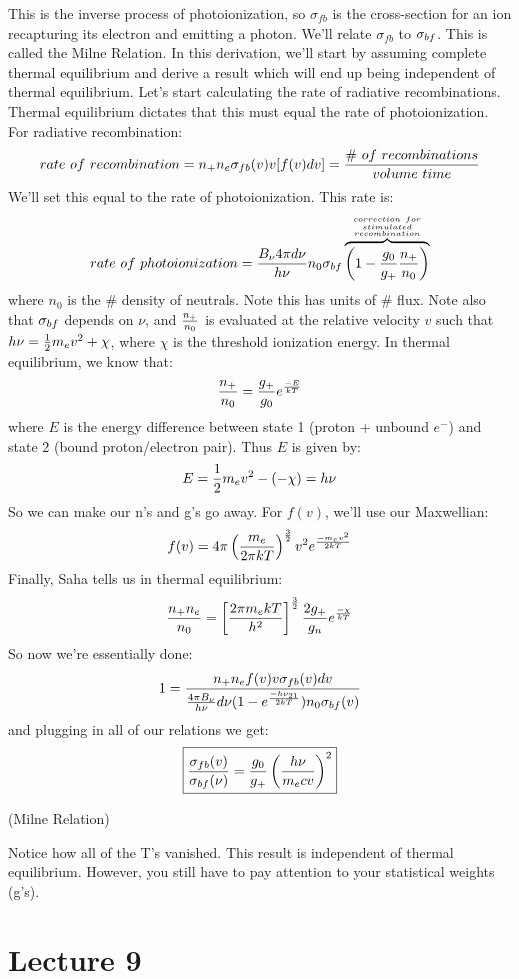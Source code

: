 \documentclass[11pt]{article}
\def\hf{{1 \over 2}}
\begin{document}
\def\sigfb{\sigma_{fb}}
This is the inverse process of photoionization, so $\sigfb$ is the cross-section
for an ion recapturing its electron and emitting a photon.  We'll relate
$\sigfb$ to $\sigma_{bf}$.  This is called the Milne Relation.  In this derivation,
we'll start by assuming complete thermal equilibrium and derive a result which
will end up being independent of thermal equilibrium.  Let's start calculating
the rate of radiative recombinations.  Thermal equilibrium dictates that this
must equal the rate of photoionization.  For radiative recombination:
$$rate\ of\ recombination
=n_+n_e\sigfb(v)v[f(v)dv]={\#\ of\ recombinations\over volume\ time}$$
We'll set this equal to the rate of photoionization. This rate is:
$$rate\ of\ photoionization
={B_\nu4\pi d\nu\over h\nu}n_0\sigbf
\overbrace{\left(1-{g_0\over g_+}{n_+\over n_0}\right)}^{{correction\ for\atop
stimulated}\atop recombination}$$
where $n_0$ is the \# density of neutrals. Note this has units of \# flux.
Note also that $\sigma_{bf}$ depends on $\nu$, and $n_+\over n_0$ is evaluated
at the relative velocity $v$ such that $h\nu=\hf m_ev^2+\chi$, where $\chi$
is the threshold ionization energy.  In thermal equilibrium, we know that:
$${n_+\over n_0}={g_+\over g_0}e^{-E\over kT}$$
where $E$ is the energy difference between state 1 (proton + unbound $e^-$)
and state 2 (bound proton/electron pair).  Thus $E$ is given by:
$$E=\hf m_ev^2-(-\chi)=h\nu$$
So we can make our n's and g's go away.  For $f(v)$, we'll use our Maxwellian:
$$f(v)=4\pi\left({m_e\over 2\pi kT}\right)^{3\over 2}v^2e^{-m_ev^2\over 2kT}$$
Finally, Saha tells us in thermal equilibrium:
$${n_+n_e\over n_0}=\left[{2\pi m_ekT\over h^2}\right]^{3\over 2}{2g_+\over g_n}
e^{-\chi\over kT}$$
So now we're essentially done:
$$1={n_+n_ef(v)v\sigfb(v)dv\over{4\pi B_\nu\over h\nu}d\nu(1-\ehvkt)
n_0\sigbf(v)}$$
and plugging in all of our relations we get:
$$\boxed{{\sigfb(v)\over\sigbf(\nu)}=
{g_0\over g_+}\left({h\nu\over m_ecv}\right)^2}$$
\centerline{(Milne Relation)}
Notice how all of the T's vanished.  
This result is independent of thermal
equilibrium.  However, you still have to pay attention to your statistical
weights (g's).

\section*{ Lecture 9 }
\end{document}
